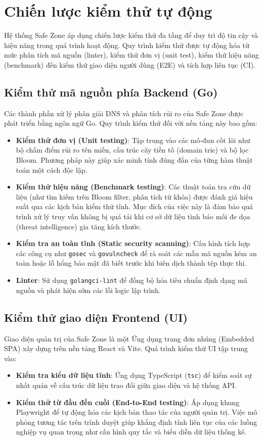 \section{Chiến lược kiểm thử tự động}

Hệ thống Safe Zone áp dụng chiến lược kiểm thử đa tầng để duy trì độ tin cậy và hiệu năng trong quá trình hoạt động. Quy trình kiểm thử được tự động hóa từ mức phân tích mã nguồn (linter), kiểm thử đơn vị (unit test), kiểm thử hiệu năng (benchmark) đến kiểm thử giao diện người dùng (E2E) và tích hợp liên tục (CI).

\subsection{Kiểm thử mã nguồn phía Backend (Go)}
Các thành phần xử lý phân giải DNS và phân tích rủi ro của Safe Zone được phát triển bằng ngôn ngữ Go. Quy trình kiểm thử đối với nền tảng này bao gồm:
\begin{itemize}
    \item \textbf{Kiểm thử đơn vị (Unit testing)}: Tập trung vào các mô-đun cốt lõi như bộ chấm điểm rủi ro tên miền, cấu trúc cây tiền tố (domain trie) và bộ lọc Bloom. Phương pháp này giúp xác minh tính đúng đắn của từng hàm thuật toán một cách độc lập.
    \item \textbf{Kiểm thử hiệu năng (Benchmark testing)}: Các thuật toán tra cứu dữ liệu (như tìm kiếm trên Bloom filter, phân tích từ khóa) được đánh giá hiệu suất qua các kịch bản kiểm thử tĩnh. Mục đích của việc này là đảm bảo quá trình xử lý truy vấn không bị quá tải khi cơ sở dữ liệu tình báo mối đe dọa (threat intelligence) gia tăng kích thước.
    \item \textbf{Kiểm tra an toàn tĩnh (Static security scanning)}: Cấu hình tích hợp các công cụ như \texttt{gosec} và \texttt{govulncheck} để rà soát các mẫu mã nguồn kém an toàn hoặc lỗ hổng bảo mật đã biết trước khi biên dịch thành tệp thực thi.
    \item \textbf{Linter}: Sử dụng \texttt{golangci-lint} để đồng bộ hóa tiêu chuẩn định dạng mã nguồn và phát hiện sớm các lỗi logic lập trình.
\end{itemize}

\subsection{Kiểm thử giao diện Frontend (UI)}
Giao diện quản trị của Safe Zone là một Ứng dụng trang đơn nhúng (Embedded SPA) xây dựng trên nền tảng React và Vite. Quá trình kiểm thử UI tập trung vào:
\begin{itemize}
    \item \textbf{Kiểm tra kiểu dữ liệu tĩnh}: Ứng dụng TypeScript (\texttt{tsc}) để kiểm soát sự nhất quán về cấu trúc dữ liệu trao đổi giữa giao diện và hệ thống API.
    \item \textbf{Kiểm thử từ đầu đến cuối (End-to-End testing)}: Áp dụng khung Playw\-right để tự động hóa các kịch bản thao tác của người quản trị. Việc mô phỏng tương tác trên trình duyệt giúp khẳng định tính liên tục của các luồng nghiệp vụ quan trọng như cấu hình quy tắc và biểu diễn dữ liệu thống kê.
\end{itemize}

